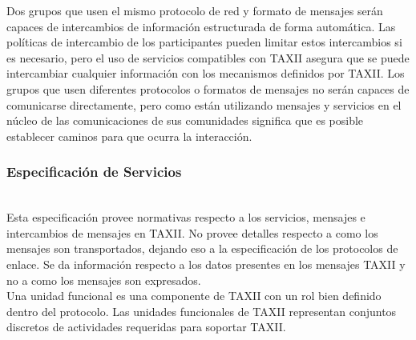Dos grupos que usen el mismo protocolo de red y formato de mensajes serán 
capaces de intercambios de información estructurada de forma automática. Las 
políticas de intercambio de los participantes pueden limitar estos intercambios 
si es necesario, pero el uso de servicios compatibles con TAXII asegura que se 
puede intercambiar cualquier información con los mecanismos definidos por TAXII. 
Los grupos que usen diferentes protocolos o formatos de mensajes no serán 
capaces de comunicarse directamente, pero como están utilizando mensajes y 
servicios en el núcleo de las comunicaciones de sus comunidades significa que es 
posible establecer caminos para que ocurra la interacción.

\subsubsection{Especificación de Servicios}\ \\

Esta especificación provee normativas respecto a los servicios, mensajes e 
intercambios de mensajes en TAXII. No provee detalles respecto a como los 
mensajes son transportados, dejando eso a la especificación de los protocolos de 
enlace. Se da información respecto a los datos presentes en los mensajes TAXII y 
no a como los mensajes son expresados.\\

Una unidad funcional es una componente de TAXII con un rol bien definido dentro del protocolo. 
Las unidades funcionales de TAXII representan conjuntos discretos de actividades 
requeridas para soportar TAXII.

